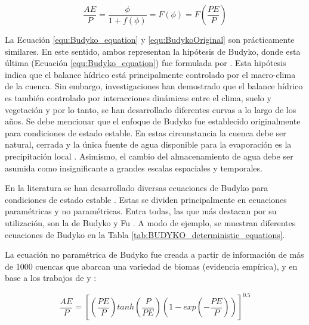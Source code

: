 \documentclass[12pt]{article}
\begin{document}
\begin{equation}
\frac{AE}{P} = \frac{\phi}{1 + f(\phi )} = F(\phi ) = F\left ( \frac{PE}{P} \right ) 
\label{equ:Budyko_equation}
\end{equation}

La Ecuación \ref{equ:Budyko_equation} y \ref{equ:BudykoOriginal} son prácticamente similares. En este sentido, ambos representan la hipótesis de Budyko, donde esta última (Ecuación \ref{equ:Budyko_equation}) fue formulada por \citet{arora2002use}. Esta hipótesis indica que el balance hídrico está principalmente controlado por el macro-clima de la cuenca. Sin embargo, investigaciones han demostrado que el balance hídrico es también controlado por interacciones dinámicas entre el clima, suelo y vegetación \citep{Gentine2012,Berghuijs2014,Greve2015} y por lo tanto, se han desarrollado diferentes curvas a lo largo de los años. Se debe mencionar que el enfoque de Budyko fue establecido originalmente para condiciones de estado estable. En estas circunstancia la cuenca debe ser natural, cerrada y la única fuente de agua disponible para la evaporación es la precipitación local \citep{Du2016}. Asimismo, el cambio del almacenamiento de agua debe ser asumida como insignificante a grandes escalas espaciales y temporales.

En la literatura se han desarrollado diversas ecuaciones de Budyko para condiciones de estado estable \citep{schreiber1904relationship,ol1911evaporation,turc1954water,budyko1958heat,Budyko1961,Pike1964,Fu1981,Koster1999,zhang2001response,zhou2015complementary,Wang2014,Zhang2004,Zhang2008,fathi2019new}. Estas se dividen principalmente en ecuaciones paramétricas y no paramétricas. Entra todas, las que más destacan por su utilización, son la de Budyko \citep{budyko1958heat} y Fu \citep{Fu1981}. A modo de ejemplo, se muestran diferentes ecuaciones de Budyko en la Tabla \ref{tab:BUDYKO_deterministic_equations}.



La ecuación no paramétrica de Budyko fue creada a partir de información de más de 1000 cuencas que abarcan una variedad de biomas (evidencia empírica), y en base a los trabajos de \citet{schreiber1904relationship} y \citet{ol1911evaporation}: 

\begin{equation}
\frac{AE}{P} = \left [\left ( \frac{PE}{P} \right )tanh\left ( \frac{P}{PE} \right )(1 - exp\left ( -\frac{PE}{P} \right ))  \right ]^{0.5}
\label{equ:no_parametric_budyko_equation}
\end{equation}
\end{document}
